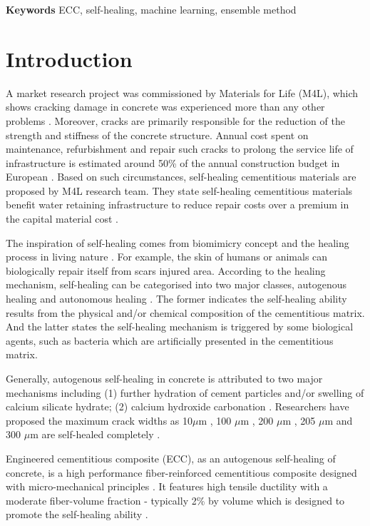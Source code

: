 \documentclass[11pt]{article}
\begin{document}
\smallskip
\noindent \textbf{Keywords } ECC, self-healing, machine learning, ensemble method

	\section{Introduction}
	
	A market research project was commissioned by Materials for Life (M4L), which shows cracking damage in concrete was experienced more than any other problems \cite{gardner2018survey}. Moreover, cracks are primarily responsible for the reduction of the strength and stiffness of the concrete structure. Annual cost spent on maintenance, refurbishment and repair such cracks to prolong the service life of infrastructure is estimated around 50\% of the annual construction budget in European \cite{cailleux2009investigations}. Based on such circumstances, self-healing cementitious materials are proposed by M4L research team. They state self-healing cementitious materials benefit water retaining infrastructure to reduce repair costs over a premium in the capital material cost \cite{gardner2018survey}. 
	
	The inspiration of self-healing comes from biomimicry concept and the healing process in living nature \cite{ramadan2017modeling}. For example, the skin of humans or animals can biologically repair itself from scars injured area. According to the healing mechanism, self-healing can be  categorised into two major classes, autogenous healing and autonomous healing \cite{tang2015robust}. The former indicates the self-healing ability results from the physical and/or chemical composition of the cementitious matrix. And the latter states the self-healing mechanism is triggered by some biological agents, such as bacteria which are artificially presented in the cementitious matrix.
	
	Generally, autogenous self-healing in concrete is attributed to two major mechanisms including (1) further hydration of cement particles and/or swelling of calcium silicate hydrate; (2) calcium hydroxide carbonation \cite{edvardsen1999water}. Researchers have proposed the maximum crack widths as 10$\mu$m \cite{jacobsen1995sem}, 100 $\mu$m \cite{reinhardt2003permeability}, 200 $\mu$m \cite{csahmaran2008influence}, 205 $\mu$m \cite{edvardsen1999water} and 300 $\mu$m \cite{clear1985effects} are self-healed completely \cite{sahmaran2013self}. 
	
	Engineered cementitious composite (ECC), as an autogenous self-healing of concrete, is a high performance fiber-reinforced cementitious composite designed with micro-mechanical principles \cite{kamada2000effects}. It features high tensile ductility with a moderate fiber-volume fraction \cite{li1998innovations,ozbay2013self} - typically 2\% by volume which is designed to promote the self-healing ability \cite{tang2015robust}. 
	
\end{document}
